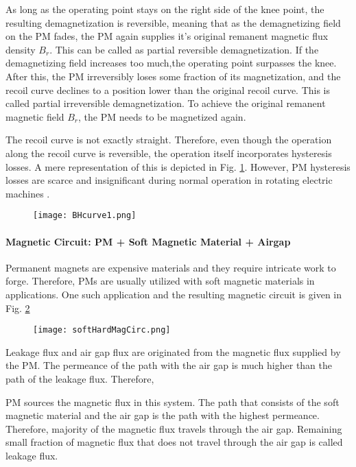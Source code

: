 As long as the operating point stays on the right side of the knee point, the resulting demagnetization is reversible, meaning that as the demagnetizing field on the PM fades, the PM again supplies it's original remanent magnetic flux density $B_{r}$. This can be called as partial reversible demagnetization. If the demagnetizing field increases too much,the operating point surpasses the knee. After this, the PM irreversibly loses some fraction of its magnetization, and the recoil curve declines to a position lower than the original recoil curve. This is called partial irreversible demagnetization. To achieve the original remanent magnetic field $B_{r}$, the PM needs to be magnetized again.

The recoil curve is not exactly straight. Therefore, even though the operation along the recoil curve is reversible, the operation itself incorporates hysteresis losses. A mere representation of this is depicted in Fig. \ref{fig:BHcurve1}. However, PM hysteresis losses are scarce and insignificant during normal operation in rotating electric machines \cite{pyrhonen_design_2014}.

\begin{figure}[h]
    \centering
    \texttt{[image: BHcurve1.png]}
    \label{fig:BHcurve1}
\end{figure}

  
\paragraph{Magnetic Circuit: PM + Soft Magnetic Material + Airgap}

Permanent magnets are expensive materials and they require intricate work to forge. Therefore, PMs are usually utilized with soft magnetic materials in applications. One such application and the resulting magnetic circuit is given in Fig. \ref{fig:softHardMagCirc}

\begin{figure}[h]
    \centering
    \texttt{[image: softHardMagCirc.png]}
    \label{fig:softHardMagCirc}
\end{figure}

Leakage flux and air gap flux are originated from the magnetic flux supplied by the PM. The permeance of the path with the air gap is much higher than the path of the leakage flux. Therefore,

PM sources the magnetic flux in this system. The path that consists of the soft magnetic material and the air gap is the path with the highest permeance. Therefore, majority of the magnetic flux travels through the air gap. Remaining small fraction of magnetic flux that does not travel through the air gap is called leakage flux.

